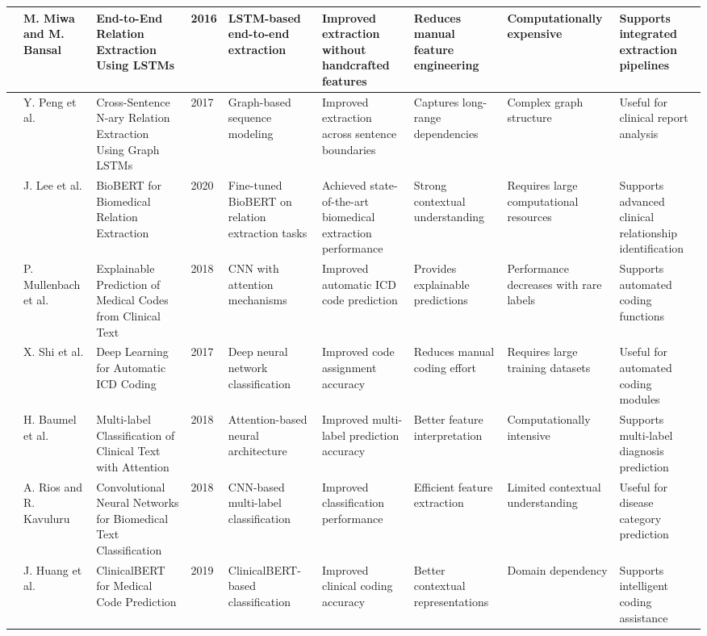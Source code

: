 \begin{landscape}
\begin{singlespace}
\begin{longtable}{|p{0.8cm}|p{1.8cm}|p{3.2cm}|p{0.8cm}|p{3.6cm}|p{3.6cm}|p{2.5cm}|p{2.5cm}|p{3.2cm}|}
\hline
\cite{ref55} & M. Miwa and M. Bansal & End-to-End Relation Extraction Using LSTMs & 2016 & LSTM-based end-to-end extraction & Improved extraction without handcrafted features & Reduces manual feature engineering & Computationally expensive & Supports integrated extraction pipelines \\
\hline
\cite{ref56} & Y. Peng et al. & Cross-Sentence N-ary Relation Extraction Using Graph LSTMs & 2017 & Graph-based sequence modeling & Improved extraction across sentence boundaries & Captures long-range dependencies & Complex graph structure & Useful for clinical report analysis \\
\hline
\cite{ref57} & J. Lee et al. & BioBERT for Biomedical Relation Extraction & 2020 & Fine-tuned BioBERT on relation extraction tasks & Achieved state-of-the-art biomedical extraction performance & Strong contextual understanding & Requires large computational resources & Supports advanced clinical relationship identification \\
\hline
\cite{ref58} & P. Mullenbach et al. & Explainable Prediction of Medical Codes from Clinical Text & 2018 & CNN with attention mechanisms & Improved automatic ICD code prediction & Provides explainable predictions & Performance decreases with rare labels & Supports automated coding functions \\
\hline
\cite{ref59} & X. Shi et al. & Deep Learning for Automatic ICD Coding & 2017 & Deep neural network classification & Improved code assignment accuracy & Reduces manual coding effort & Requires large training datasets & Useful for automated coding modules \\
\hline
\cite{ref60} & H. Baumel et al. & Multi-label Classification of Clinical Text with Attention & 2018 & Attention-based neural architecture & Improved multi-label prediction accuracy & Better feature interpretation & Computationally intensive & Supports multi-label diagnosis prediction \\
\hline
\cite{ref61} & A. Rios and R. Kavuluru & Convolutional Neural Networks for Biomedical Text Classification & 2018 & CNN-based multi-label classification & Improved classification performance & Efficient feature extraction & Limited contextual understanding & Useful for disease category prediction \\
\hline
\cite{ref62} & J. Huang et al. & ClinicalBERT for Medical Code Prediction & 2019 & ClinicalBERT-based classification & Improved clinical coding accuracy & Better contextual representations & Domain dependency & Supports intelligent coding assistance \\

\end{longtable}
\end{singlespace}
\end{landscape}
